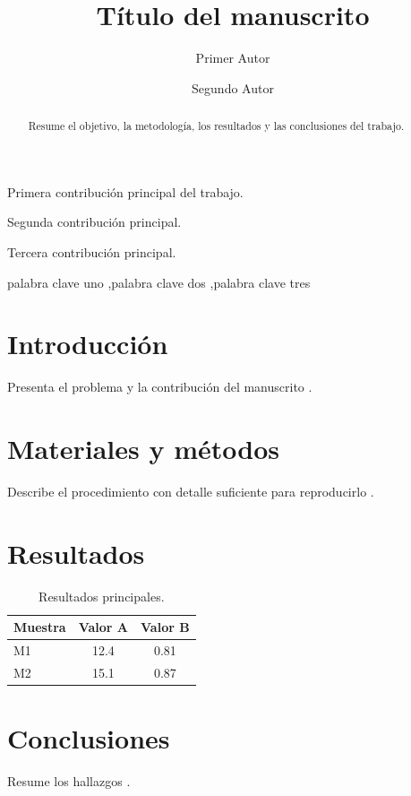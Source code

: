 \documentclass[preprint,12pt]{elsarticle}
\begin{document}
\begin{frontmatter}

\title{Título del manuscrito}

\author[uni]{Primer Autor}
\author[uni,inst]{Segundo Autor}



\begin{abstract}
Resume el objetivo, la metodología, los resultados y las conclusiones del trabajo.
\end{abstract}

\begin{highlights}
\item Primera contribución principal del trabajo.
\item Segunda contribución principal.
\item Tercera contribución principal.
\end{highlights}

\begin{keyword}
palabra clave uno \sep palabra clave dos \sep palabra clave tres
\end{keyword}

\end{frontmatter}

\section{Introducción}
Presenta el problema y la contribución del manuscrito \cite{lamport1994}.

\section{Materiales y métodos}
Describe el procedimiento con detalle suficiente para reproducirlo \cite{knuth1984}.

\section{Resultados}
\begin{table}[htbp]
  \centering
  \caption{Resultados principales.}
  \begin{tabular}{lcc}
    \toprule
    Muestra & Valor A & Valor B \\
    \midrule
    M1 & 12.4 & 0.81 \\
    M2 & 15.1 & 0.87 \\
    \bottomrule
  \end{tabular}
\end{table}

\section{Conclusiones}
Resume los hallazgos \cite{goossens2004}.



\end{document}
